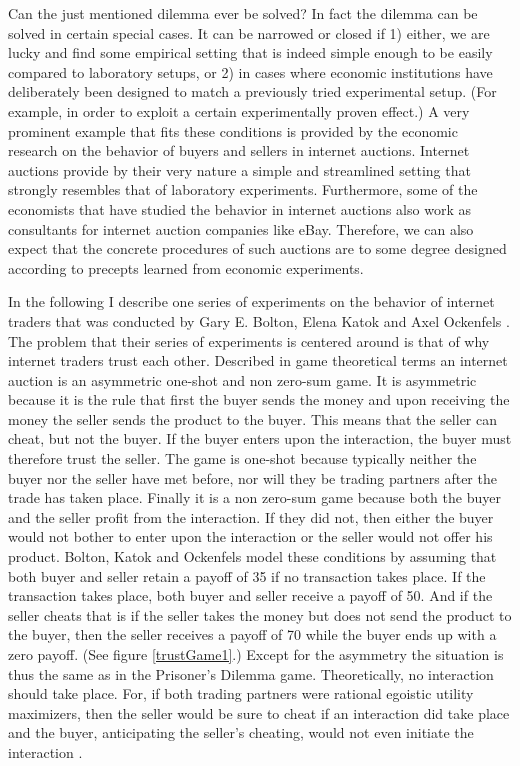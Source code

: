 Can the just mentioned dilemma ever be solved? In fact the dilemma can be
solved in certain special cases. It can be narrowed or closed if 1) either, we
are lucky and find some empirical setting that is indeed simple enough to be
easily compared to laboratory setups, or 2) in cases where
economic institutions have deliberately been designed to match a previously
tried experimental setup. (For example, in order to exploit a certain
experimentally proven effect.) A very prominent example that fits these
conditions is provided by the economic research on the behavior of buyers
and sellers in internet auctions. Internet auctions provide by their very
nature a simple and streamlined setting that strongly resembles that of
laboratory experiments. Furthermore, some of the economists that have studied
the behavior in internet auctions also work as consultants for internet
auction companies like eBay. Therefore, we can also expect that the concrete
procedures of such auctions are to some degree designed according to precepts
learned from economic experiments.

In the following I describe one series of experiments on the behavior of
internet traders that was conducted by Gary E. Bolton, Elena Katok and Axel
Ockenfels \cite[]{bolton-katok-ockenfels:2004}. The problem that their series
of experiments is centered around is that of why internet traders trust each
other. Described in game theoretical terms an internet auction is an
asymmetric one-shot and non zero-sum game. It is asymmetric because it is the
rule that first the buyer sends the money and upon receiving the money the
seller sends the product to the buyer. This means that the seller can cheat,
but not the buyer. If the buyer enters upon the interaction, the buyer must
therefore trust the seller. The game is one-shot because
typically neither the buyer nor the seller have met before, nor will they be
trading partners after the trade has taken place. Finally it is a non
zero-sum game because both the buyer and the seller profit from the
interaction. If they did not, then either the buyer would not bother to enter
upon the interaction or the seller would not offer his product. Bolton, Katok
and Ockenfels model these conditions by assuming that both buyer and seller
retain a payoff of 35 if no transaction takes place. If the transaction takes
place, both buyer and seller receive a payoff of 50. And if the seller cheats
that is if the seller takes the money but does not send the product to the
buyer, then the seller receives a payoff of 70 while the buyer ends up with a
zero payoff. (See figure \ref{trustGame1}.) Except for the asymmetry the situation is thus the same as in
the Prisoner's Dilemma game. Theoretically, no interaction should take place.
For, if both trading partners were rational egoistic utility maximizers, then
the seller would be sure to cheat if an interaction did take place and the
buyer, anticipating the seller's cheating, would not even initiate the
interaction \cite[p.\ 188]{bolton-katok-ockenfels:2004}.

